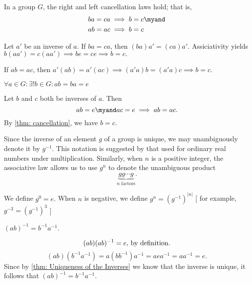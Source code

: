 \begin{thm}[Cancellation]
  \label{thm: cancellation}
  In a group $G$, the right and left cancellation laws hold; that is,
  \begin{equation}
    \begin{aligned}
      ba &= ca \implies b=c \myand \\
      ab &= ac \implies b=c
    \end{aligned}
  \end{equation}
\end{thm}
\begin{prf}
  Let $a'$ be an inverse of $a$. If $ba=ca$, then $(ba)a' = (ca)a'$. Assiciativity yields $b(aa')=c(aa') \implies be = ce \implies b = c. $

  If $ab = ac$, then $a'(ab)=a'(ac) \implies (a'a)b=(a'a)c \implies b=c.$
\end{prf}

\begin{thm}
  \label{thm: Uniqueness of the Inverses}
  $\forall a \in G: \exists ! b\in G: ab = ba = e$
\end{thm}
\begin{prf}
  Let $b$ and $c$ both be inverses of $a$. Then
  \begin{equation}
    ab = e \myand ac = e \implies ab = ac.
  \end{equation}
  By \ref{thm: cancellation}, we have $b=c$.
\end{prf}

\begin{mydef}[notation: $g^{-1}$]
  Since the inverse of an element $g$ of a group is unique, we may unambiguously denote it by $g^{-1}$. This notation is suggested by that used for ordinary real numbers under multiplication. Similarly, when $n$ is a positive integer, the associative law allows us to use $g^n$ to denote the unambiguous product
  \begin{equation}
    \underbrace{gg\cdots g}_{\text{$n$ factors}}.
  \end{equation}

  We define $g^0=e.$ When $n$ is negative, we define $g^n=(g^{-1})^{|n|}$ [ for example, $g^{-3} = (g^{-1})^3$ ]
\end{mydef}

\begin{thm} 
  $(ab)^{-1}=b^{-1}a^{-1}.$
\end{thm}
\begin{prf}
  \begin{equation}
    (ab)(ab)^{-1}=e, $ by definition.$
  \end{equation}
  \begin{equation}
    (ab)(b^{-1}a^{-1}) = a(bb^{-1})a^{-1} = aea^{-1} = aa^{-1} = e.
  \end{equation}
  Since by \ref{thm: Uniqueness of the Inverses} we know that the inverse is unique, it follows that $(ab)^{-1} = b^{-1}a^{-1}$.
\end{prf}